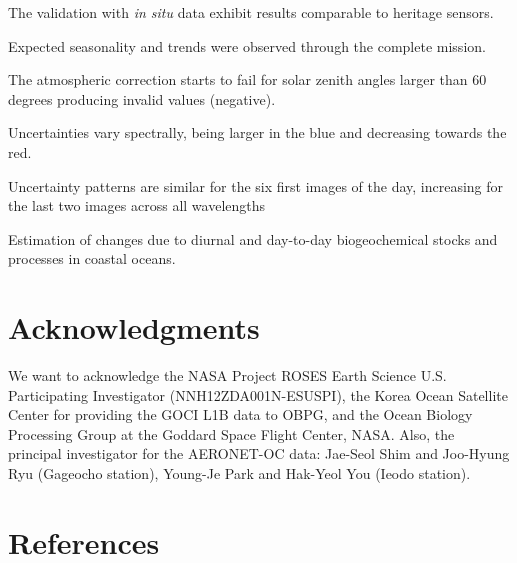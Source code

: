\documentclass[onecolumn,3p,letterpaper,11pt]{elsarticle}
\begin{document}
The validation with {\it in situ} data exhibit results comparable to heritage sensors.

Expected seasonality and trends were observed through the complete mission.

The atmospheric correction starts to fail for solar zenith angles larger than 60 degrees producing invalid values (negative). 

Uncertainties vary spectrally, being larger in the blue and decreasing towards the red.

Uncertainty patterns are similar for the six first images of the day, increasing for the last two images across all wavelengths

Estimation of changes due to diurnal and day-to-day biogeochemical stocks and processes in coastal oceans.


\section*{Acknowledgments}
\vspace{-.2cm}
We want to acknowledge the NASA Project ROSES Earth Science U.S. Participating Investigator (NNH12ZDA001N-ESUSPI), the Korea Ocean Satellite Center for providing the GOCI L1B data to OBPG, and the Ocean Biology Processing Group at the Goddard Space Flight Center, NASA. Also, the principal investigator for the AERONET-OC data: Jae-Seol Shim and Joo-Hyung Ryu (Gageocho station), Young-Je Park and Hak-Yeol You (Ieodo station).

\section*{References}


%

%

\end{document}
